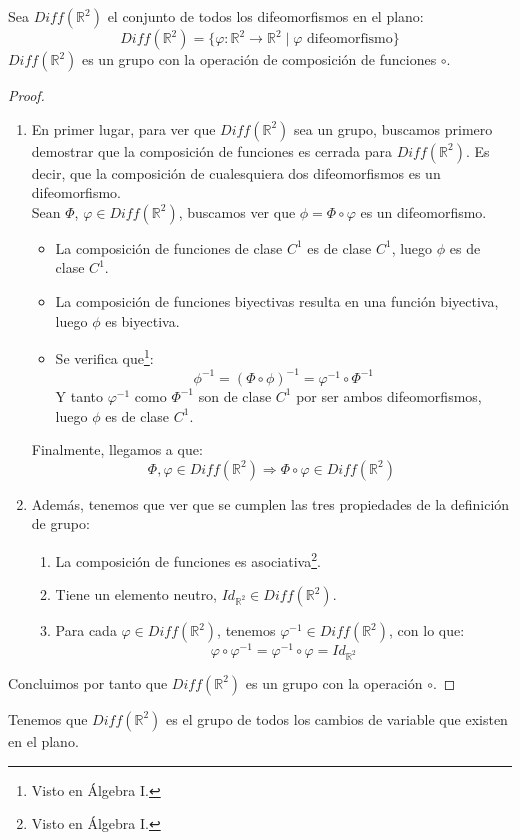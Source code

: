\begin{prop}
    Sea $Diff(\mathbb{R}^2)$ el conjunto de todos los difeomorfismos en el plano:
\begin{equation*}
    Diff(\mathbb{R}^2) = \{\varphi:\mathbb{R}^2\rightarrow\mathbb{R}^2 \mid \varphi \text{\ difeomorfismo}\}
\end{equation*}
$Diff(\mathbb{R}^2)$ es un grupo con la operación de composición de funciones $\circ$.
\begin{proof}\ 
    \begin{enumerate}
        \item En primer lugar, para ver que $Diff(\mathbb{R}^2)$ sea un grupo, buscamos primero demostrar que la composición de funciones es cerrada para $Diff(\mathbb{R}^2)$. Es decir, que la composición de cualesquiera dos difeomorfismos es un difeomorfismo.\\

            Sean $\Phi$, $\varphi \in Diff(\mathbb{R}^2)$, buscamos ver que $\phi = \Phi \circ \varphi$ es un difeomorfismo.
\begin{itemize}
    \item La composición de funciones de clase $C^1$ es de clase $C^1$, luego $\phi$ es de clase $C^1$.
    \item La composición de funciones biyectivas resulta en una función biyectiva, luego $\phi$ es biyectiva.
    \item Se verifica que\footnote{Visto en Álgebra I.}:
        \begin{equation*}
            \phi^{-1} = {(\Phi \circ \phi)}^{-1} = \varphi^{-1} \circ \Phi^{-1}
        \end{equation*}
        Y tanto $\varphi^{-1}$ como $\Phi^{-1}$ son de clase $C^1$ por ser ambos difeomorfismos, luego $\phi$ es de clase $C^1$.
\end{itemize}
Finalmente, llegamos a que:
\begin{equation*}
    \Phi, \varphi \in Diff(\mathbb{R}^2) \Longrightarrow \Phi \circ \varphi \in Diff(\mathbb{R}^2)
\end{equation*}
    \item Además, tenemos que ver que se cumplen las tres propiedades de la definición de grupo:
        \begin{enumerate}[label=(\arabic*)]
        \item La composición de funciones es asociativa\footnote{Visto en Álgebra I.}.
        \item Tiene un elemento neutro, $Id_{\mathbb{R}^2}\in Diff(\mathbb{R}^2)$.
        \item Para cada $\varphi \in Diff(\mathbb{R}^2)$, tenemos $\varphi^{-1}\in Diff(\mathbb{R}^2)$, con lo que:
            \begin{equation*}
                \varphi \circ \varphi^{-1} = \varphi^{-1} \circ \varphi = Id_{\mathbb{R}^2}
            \end{equation*}
        \end{enumerate}
\end{enumerate}
Concluimos por tanto que $Diff(\mathbb{R}^2)$ es un grupo con la operación $\circ$.
\end{proof}
\end{prop}
Tenemos que $Diff(\mathbb{R}^2)$ es el grupo de todos los cambios de variable que existen en el plano.

